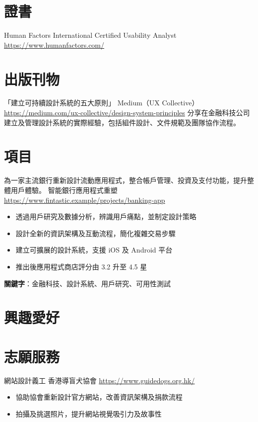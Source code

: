\documentclass[a4paper, serif, 10pt]{moderncv}
\begin{document}
\section{證書}

        {Human Factors International}
        {Certified Usability Analyst}
        {\url{https://www.humanfactors.com/}}
        {}
        {}
\section{出版刊物}

        {「建立可持續設計系統的五大原則」}
        {Medium（UX Collective）}
        {\url{https://medium.com/ux-collective/design-system-principles}}
        {}
        {分享在金融科技公司建立及管理設計系統的實際經驗，包括組件設計、文件規範及團隊協作流程。}
\section{項目}

        {為一家主流銀行重新設計流動應用程式，整合帳戶管理、投資及支付功能，提升整體用戶體驗。
}
        {智能銀行應用程式重塑}
        {\url{https://www.fintastic.example/projects/banking-app}}
        {}
        {\begin{itemize}
\item 透過用戶研究及數據分析，辨識用戶痛點，並制定設計策略
\item 設計全新的資訊架構及互動流程，簡化複雜交易步驟
\item 建立可擴展的設計系統，支援 iOS 及 Android 平台
\item 推出後應用程式商店評分由 3.2 升至 4.5 星
\end{itemize}
\textbf{關鍵字}：金融科技、設計系統、用戶研究、可用性測試}
\section{興趣愛好}

\section{志願服務}

        {網站設計義工}
        {香港導盲犬協會}
        {\url{https://www.guidedogs.org.hk/}}
        {}
        {\begin{itemize}
\item 協助協會重新設計官方網站，改善資訊架構及捐款流程
\item 拍攝及挑選照片，提升網站視覺吸引力及故事性
\end{itemize}}
    
\end{document}
